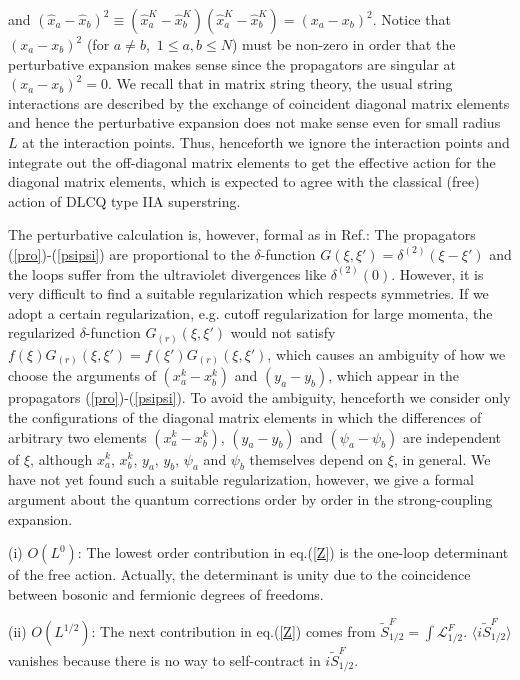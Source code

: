 \documentclass[a4paper,12pt]{article}
\newcommand{\calL}{\mathcal{L}}
\newcommand{\vev}[1]{\langle #1 \rangle}
\begin{document}
and $(\hat{x}_a-\hat{x}_b)^2\equiv(\hat{x}_a^K-\hat{x}_b^K)
(\hat{x}_a^K-\hat{x}_b^K)=(x_a-x_b)^2$.
Notice that $(x_{a}-x_b)^2$ (for $a\ne b$,\ $1\leq a,b\leq N$) must be
non-zero in order that the perturbative expansion makes sense since
the propagators are singular at $(x_a-x_b)^2=0$.
We recall that in matrix string theory, the usual string interactions
are described by the exchange of coincident diagonal matrix elements
and hence the perturbative expansion does not make sense even for
small radius $L$ at the interaction points.
Thus, henceforth we ignore the interaction points and integrate out
the off-diagonal matrix elements to get the effective action for the
diagonal matrix elements, which is expected to agree with the
classical (free) action of DLCQ type IIA superstring.

The perturbative calculation is, however, formal as in Ref.\cite{SY}:
The propagators (\ref{pro})-(\ref{psipsi}) are proportional to the
$\delta$-function $G(\xi,\xi')=\delta^{(2)}(\xi-\xi')$ and
the loops suffer from the ultraviolet divergences like
$\delta^{(2)}(0)$.
However, it is very difficult to find a suitable regularization
which respects symmetries.
If we adopt a certain regularization, e.g. cutoff regularization for
large momenta, the regularized $\delta$-function $G_{(r)}(\xi,\xi')$
would not satisfy $f(\xi)G_{(r)}(\xi,\xi')=f(\xi')G_{(r)}(\xi,\xi')$,
which causes an ambiguity of how we choose the arguments of
$(x_a^k-x_b^k)$ and $(y_a-y_b)$, which appear in the propagators
(\ref{pro})-(\ref{psipsi}).
To avoid the ambiguity, henceforth we consider only the configurations
of the diagonal matrix elements in which the differences of arbitrary
two elements $(x_a^k-x_b^k)$, $(y_a-y_b)$ and
$(\psi_a-\psi_b)$ are independent of $\xi$,
although $x_a^k$, $x_b^k$, $y_a$, $y_b$, $\psi_a$ and $\psi_b$
themselves depend on $\xi$, in general.
We have not yet found such a suitable regularization, however,
we give a formal argument about the quantum corrections order by order
in the strong-coupling expansion.
 
(i) $O(L^{0})$:
The lowest order contribution in eq.(\ref{Z}) is the one-loop
determinant of the free action. Actually, the determinant is unity due
to the coincidence between bosonic and fermionic degrees of freedoms.

(ii) $O(L^{1/2})$:
The next contribution in eq.(\ref{Z}) comes from
$\tilde{S}_{1/2}^F=\int \calL_{1/2}^F$.
$\vev{i\tilde{S}_{1/2}^F}$ vanishes because
there is no way to self-contract in $i\tilde{S}_{1/2}^F$.
\end{document}
